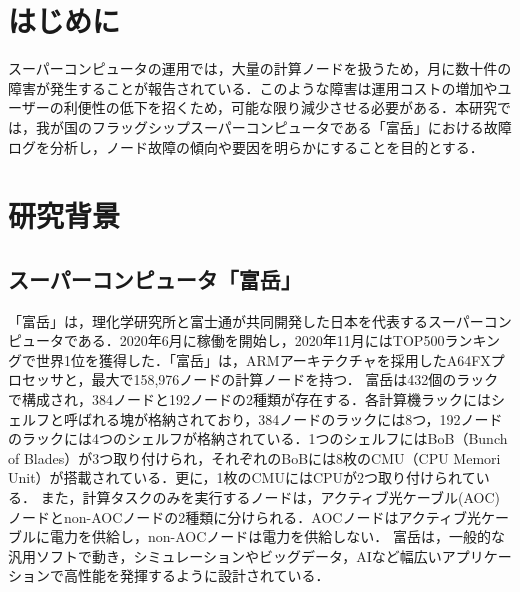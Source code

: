 \documentclass[a4paper,11pt,twocolumn]{jsarticle}
\begin{document}

\section{はじめに}
スーパーコンピュータの運用では，大量の計算ノードを扱うため，月に数十件の障害が発生することが報告されている\cite{HPC_system_fail}．このような障害は運用コストの増加やユーザーの利便性の低下を招くため，可能な限り減少させる必要がある．本研究では，我が国のフラッグシップスーパーコンピュータである「富岳」における故障ログを分析し，ノード故障の傾向や要因を明らかにすることを目的とする．


\section{研究背景}

\subsection{スーパーコンピュータ「富岳」}\label{sec:fugaku}
「富岳」は，理化学研究所と富士通が共同開発した日本を代表するスーパーコンピュータである．2020年6月に稼働を開始し，2020年11月にはTOP500ランキングで世界1位を獲得した\cite{HPCG}．「富岳」は，ARMアーキテクチャを採用したA64FXプロセッサと，最大で158,976ノードの計算ノードを持つ\cite{Fugaku_Web}．
富岳は432個のラックで構成され，384ノードと192ノードの2種類が存在する．各計算機ラックにはシェルフと呼ばれる塊が格納されており，384ノードのラックには8つ，192ノードのラックには4つのシェルフが格納されている．1つのシェルフにはBoB（Bunch of Blades）が3つ取り付けられ，それぞれのBoBには8枚のCMU（CPU Memori Unit）が搭載されている．更に，1枚のCMUにはCPUが2つ取り付けられている．
また，計算タスクのみを実行するノードは，アクティブ光ケーブル(AOC)ノードとnon-AOCノードの2種類に分けられる．AOCノードはアクティブ光ケーブルに電力を供給し，non-AOCノードは電力を供給しない．
富岳は，一般的な汎用ソフトで動き，シミュレーションやビッグデータ，AIなど幅広いアプリケーションで高性能を発揮するように設計されている．
\end{document}
